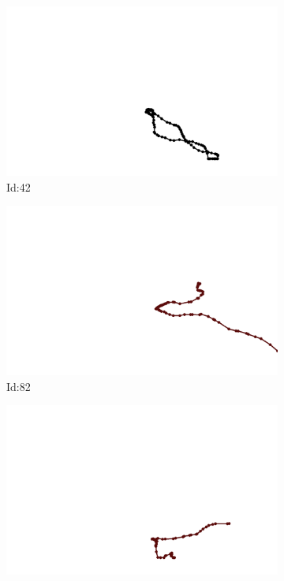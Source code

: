 \documentclass[12pt,twoside]{report}
\begin{document}
\begin{figure}
\centering
\begin{subfigure}[b]{0.20\textwidth}
\centering
\includegraphics[width=\textwidth]{../trajectories/42.png}
\caption{Id:42}
\end{subfigure}
\begin{subfigure}[b]{0.20\textwidth}
\centering
\includegraphics[width=\textwidth]{../trajectories/82.png}
\caption{Id:82}
\end{subfigure}
\begin{subfigure}[b]{0.20\textwidth}
\centering
\includegraphics[width=\textwidth]{../trajectories/110.png}

\end{subfigure}
\end{figure}
\end{document}
